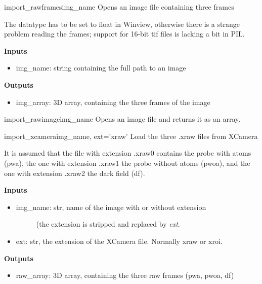 \documentclass[letterpaper,10pt,english]{manual}
\begin{document}
\hypertarget{imageio.import_rawframes}{}\begin{funcdesc}{import\_rawframes}{img\_name}
Opens an image file containing three frames

The datatype has to be set to float in Winview, otherwise there is a
strange problem reading the frames; support for 16-bit tif files is
lacking a bit in PIL.

\textbf{Inputs}
\begin{itemize}
\item {} 
img\_name: string containing the full path to an image

\end{itemize}

\textbf{Outputs}
\begin{itemize}
\item {} 
img\_array: 3D array, containing the three frames of the image

\end{itemize}
\end{funcdesc}

\hypertarget{imageio.import_rawimage}{}\begin{funcdesc}{import\_rawimage}{img\_name}
Opens an image file and returns it as an array.
\end{funcdesc}

\hypertarget{imageio.import_xcamera}{}\begin{funcdesc}{import\_xcamera}{img\_name, ext='xraw'}
Load the three .xraw files from XCamera

It is assumed that the file with extension .xraw0 contains the probe
with atoms (pwa), the one with extension .xraw1 the probe without atoms
(pwoa), and the one with extension .xraw2 the dark field (df).

\textbf{Inputs}
\begin{itemize}
\item {} \begin{description}
\item[img\_name: str, name of the image with or without extension]
(the extension is stripped and replaced by \emph{ext}.

\end{description}

\item {} 
ext: str, the extension of the XCamera file. Normally xraw or xroi.

\end{itemize}

\textbf{Outputs}
\begin{itemize}
\item {} 
raw\_array: 3D array, containing the three raw frames (pwa, pwoa, df)

\end{itemize}
\end{funcdesc}
\end{document}
